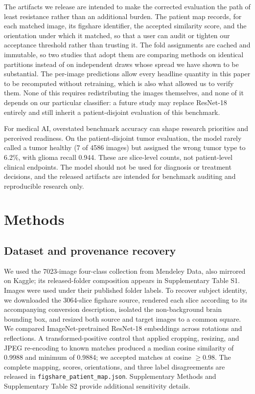 ﻿\documentclass[twocolumn]{article}
\begin{document}
The artifacts we release are intended to make the corrected evaluation the path of least resistance rather than an additional burden. The patient map records, for each matched image, its figshare identifier, the accepted similarity score, and the orientation under which it matched, so that a user can audit or tighten our acceptance threshold rather than trusting it. The fold assignments are cached and immutable, so two studies that adopt them are comparing methods on identical partitions instead of on independent draws whose spread we have shown to be substantial. The per-image predictions allow every headline quantity in this paper to be recomputed without retraining, which is also what allowed us to verify them. None of this requires redistributing the images themselves, and none of it depends on our particular classifier: a future study may replace ResNet-18 entirely and still inherit a patient-disjoint evaluation of this benchmark.

For medical AI, overstated benchmark accuracy can shape research priorities and perceived readiness. On the patient-disjoint tumor evaluation, the model rarely called a tumor healthy (7 of 4586 images) but assigned the wrong tumor type to 6.2\%, with glioma recall 0.944. These are slice-level counts, not patient-level clinical endpoints. The model should not be used for diagnosis or treatment decisions, and the released artifacts are intended for benchmark auditing and reproducible research only.

\section{Methods}
\subsection{Dataset and provenance recovery}
We used the 7023-image four-class collection from Mendeley Data\cite{ghaffar2024dataset}, also mirrored on Kaggle\cite{nickparvar2021dataset}; its released-folder composition appears in Supplementary Table S1. Images were used under their published folder labels. To recover subject identity, we downloaded the 3064-slice figshare source\cite{cheng2015enhanced}, rendered each slice according to its accompanying conversion description, isolated the non-background brain bounding box, and resized both source and target images to a common square. We compared ImageNet-pretrained ResNet-18 embeddings across rotations and reflections. A transformed-positive control that applied cropping, resizing, and JPEG re-encoding to known matches produced a median cosine similarity of 0.9988 and minimum of 0.9884; we accepted matches at cosine $\geq0.98$. The complete mapping, scores, orientations, and three label disagreements are released in \texttt{figshare\_patient\_map.json}. Supplementary Methods and Supplementary Table S2 provide additional sensitivity details.
\end{document}
